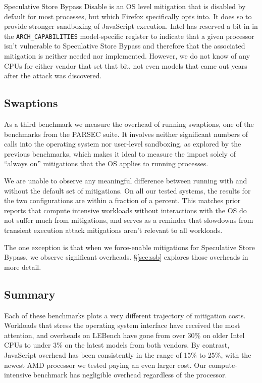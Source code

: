Speculative Store Bypass Disable is an OS level mitigation that is disabled by default for most processes, but which Firefox specifically opts into.
It does so to provide stronger sandboxing of JavaScript execution.
Intel has reserved a bit in in the \texttt{ARCH\_CAPABILITIES} model-specific register to indicate that a given processor isn't vulnerable to Speculative Store Bypass and therefore that the associated mitigation is neither needed nor implemented.
However, we do not know of any CPUs for either vendor that set that bit, not even models that came out years after the attack was discovered.

\subsection{Swaptions}
\label{sec:parsec}
As a third benchmark we measure the overhead of running swaptions, one of the benchmarks from the PARSEC suite.
It involves neither significant numbers of calls into the operating system nor user-level sandboxing, as explored by the previous benchmarks, which makes it ideal to measure the impact solely of ``always on'' mitigations that the OS applies to running processes.

We are unable to observe any meaningful difference between running with and without the default set of mitigations.
On all our tested systems, the results for the two configurations are within a fraction of a percent.
This matches prior reports that compute intensive workloads without interactions with the OS do not suffer much from mitigations, and serves as a reminder that slowdowns from transient execution attack mitigations aren't relevant to all workloads.

The one exception is that when we force-enable mitigations for Speculative Store Bypass, we observe significant overheads.
\S\ref{sec:ssb} explores those overheads in more detail.

\subsection{Summary}
Each of these benchmarks plots a very different trajectory of mitigation costs.
Workloads that stress the operating system interface have received the most attention, and overheads on LEBench have gone from over 30\% on older Intel CPUs to under 3\% on the latest models from both vendors.
By contrast, JavaScript overhead has been consistently in the range of 15\% to 25\%, with the newest AMD processor we tested paying an even larger cost.
Our compute-intensive benchmark has negligible overhead regardless of the processor.

